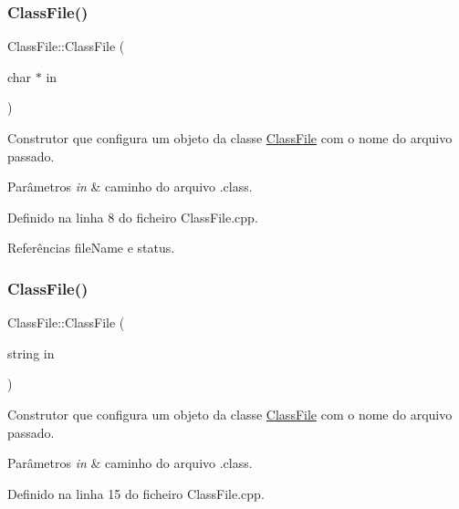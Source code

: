 \subsubsection{\texorpdfstring{Class\+File()}{ClassFile()}\hspace{0.1cm}{\footnotesize\ttfamily [1/2]}}
{\footnotesize\ttfamily Class\+File\+::\+Class\+File (\begin{DoxyParamCaption}\item[{char $\ast$}]{in }\end{DoxyParamCaption})}



Construtor que configura um objeto da classe \hyperlink{classClassFile}{Class\+File} com o nome do arquivo passado. 


\begin{DoxyParams}{Parâmetros}
{\em in} & caminho do arquivo .class. \\
\hline
\end{DoxyParams}


Definido na linha 8 do ficheiro Class\+File.\+cpp.



Referências file\+Name e status.

\mbox{\label{classClassFile_ab442e7b0a5f8c4eeae4f668c4e02c396}} 
\subsubsection{\texorpdfstring{Class\+File()}{ClassFile()}\hspace{0.1cm}{\footnotesize\ttfamily [2/2]}}
{\footnotesize\ttfamily Class\+File\+::\+Class\+File (\begin{DoxyParamCaption}\item[{string}]{in }\end{DoxyParamCaption})}



Construtor que configura um objeto da classe \hyperlink{classClassFile}{Class\+File} com o nome do arquivo passado. 


\begin{DoxyParams}{Parâmetros}
{\em in} & caminho do arquivo .class. \\
\hline
\end{DoxyParams}


Definido na linha 15 do ficheiro Class\+File.\+cpp.



